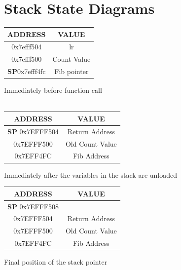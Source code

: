 \documentclass{article}
\begin{document}
	\section{Stack State Diagrams}
	\begin{tabular}{|c|c|}
		\hline
		\textbf{ADDRESS} & \textbf{VALUE} \\
		\hline
		0x7efff504 & lr \\
		\hline
		0x7efff500 & Count Value\\
		\hline
		\textbf{SP}0x7efff4fc & Fib pointer\\
		\hline
	\end{tabular}
	Immediately before function call\\ \\
	\begin{tabular}{|c|c|}
		\hline
		\textbf{ADDRESS} & \textbf{VALUE}\\
		\hline
		\textbf{SP} 0x7EFFF504 & Return Address\\
		\hline
		0x7EFFF500 & Old Count Value\\
		\hline
		0x7EFF4FC & Fib Address\\
		\hline
	\end{tabular}
	Immediately after the variables in the stack are unloaded \\
	\begin{tabular}{|c|c|}
		\hline
		\textbf{ADDRESS} & \textbf{VALUE} \\
		\hline
		\textbf{SP} 0x7EFFF508 & \\
		\hline
		0x7EFFF504 & Return Address\\
		\hline
		0x7EFFF500 & Old Count Value\\
		\hline
		0x7EFF4FC & Fib Address\\
		\hline
	\end{tabular}
	Final position of the stack pointer
	
	
\end{document}
